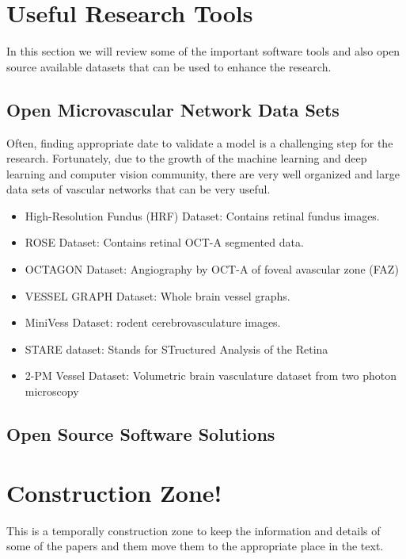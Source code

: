 \documentclass[10pt,a4paper,twocolumn]{article}
\begin{document}
	
	\section{Useful Research Tools}
	In this section we will review some of the important software tools and also open source available datasets that can be used to enhance the research.
	\subsection{Open Microvascular Network Data Sets}
	Often, finding appropriate date to validate a model is a challenging step for the research. Fortunately, due to the growth of the machine learning and deep learning and computer vision community, there are very well organized and large data sets of vascular networks that can be very useful.
	\begin{itemize}
		\item High-Resolution Fundus (HRF) Dataset: Contains retinal fundus images.
		\item ROSE Dataset: Contains retinal OCT-A segmented data.
		\item OCTAGON Dataset: Angiography by OCT-A of foveal avascular zone (FAZ)
		\item VESSEL GRAPH Dataset: Whole brain vessel graphs.
		\item MiniVess Dataset: rodent cerebrovasculature images.
		\item STARE dataset: Stands for STructured Analysis of the Retina
		\item 2-PM Vessel Dataset: Volumetric brain vasculature dataset from two photon microscopy
	\end{itemize}
	
	\subsection{Open Source Software Solutions}
	
	
	\section{Construction Zone!}
	This is a temporally construction zone to keep the information and details of some of the papers and them move them to the appropriate place in the text. 
	
\end{document}
